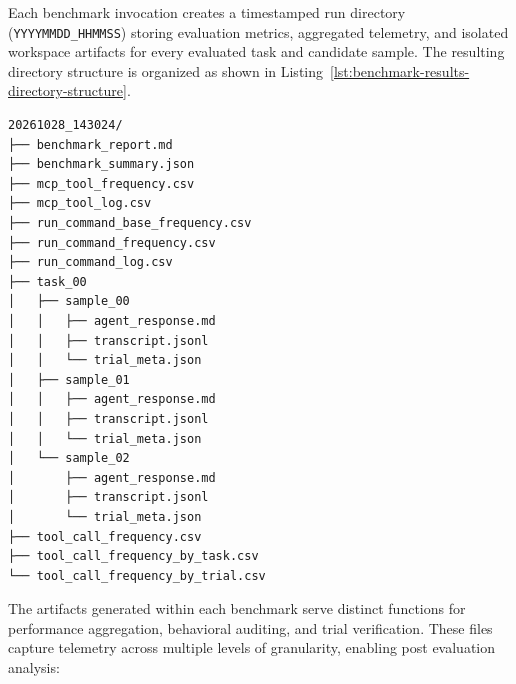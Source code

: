 Each benchmark invocation creates a timestamped run directory (\texttt{YYYYMMDD\_HHMMSS}) storing evaluation
metrics, aggregated telemetry, and isolated workspace artifacts for every evaluated
task and candidate sample. The resulting directory structure is organized as
shown in Listing~\ref{lst:benchmark-results-directory-structure}.

\begin{lstlisting}[caption={Benchmark Execution Output Directory Structure}, label={lst:benchmark-results-directory-structure}]
20261028_143024/
├── benchmark_report.md
├── benchmark_summary.json
├── mcp_tool_frequency.csv
├── mcp_tool_log.csv
├── run_command_base_frequency.csv
├── run_command_frequency.csv
├── run_command_log.csv
├── task_00
│   ├── sample_00
│   │   ├── agent_response.md
│   │   ├── transcript.jsonl
│   │   └── trial_meta.json
│   ├── sample_01
│   │   ├── agent_response.md
│   │   ├── transcript.jsonl
│   │   └── trial_meta.json
│   └── sample_02
│       ├── agent_response.md
│       ├── transcript.jsonl
│       └── trial_meta.json
├── tool_call_frequency.csv
├── tool_call_frequency_by_task.csv
└── tool_call_frequency_by_trial.csv
\end{lstlisting}

The artifacts generated within each benchmark serve distinct functions for performance
aggregation, behavioral auditing, and trial verification. These files capture
telemetry across multiple levels of granularity, enabling post evaluation analysis:


